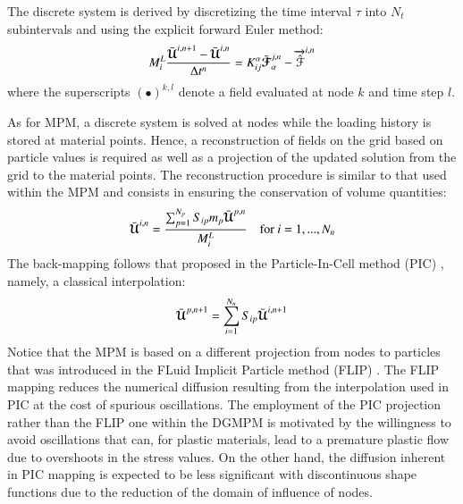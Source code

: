 The discrete system is derived by discretizing the time interval $\tau$ into $N_t$ subintervals and using the explicit forward Euler method:
\begin{equation}
  \label{eq:DGMPM_discrete}
  M^L_i \frac{\bar{{\boldsymbol{\mathcal{U}}}}^{i,n+1} - \bar{{\boldsymbol{\mathcal{U}}}}^{i,n}}{\Delta t^{n} } = K^\alpha_{ij} \bar{{\boldsymbol{\mathcal{F}}}}_{\alpha}^{j,n} - {\overrightarrow{\hat{\mathcal{F}}}}^{i,n}  
\end{equation}
where the superscripts $(\bullet)^{k,l}$ denote a field evaluated at node $k$ and time step $l$.

As for MPM, a discrete system is solved at nodes while the loading history is stored at material points.
Hence, a reconstruction of fields on the grid based on particle values is required as well as a projection of the updated solution from the grid to the material points.
The reconstruction procedure is similar to that used within the MPM and consists in ensuring the conservation of volume quantities:
\begin{equation}
  \label{eq:reconstruction}
  \bar{{\boldsymbol{\mathcal{U}}}}^{i,n} =  \frac{\sum_{p=1}^{N_p}S_{ip}m_p\bar{{\boldsymbol{\mathcal{U}}}}^{p,n}}{M_{i}^L }  \quad \text{for } i=1,...,N_n
\end{equation}
The back-mapping follows that proposed in the Particle-In-Cell method (PIC) \cite{PIC}, namely, a classical interpolation:
\begin{equation}
  \label{eq:back_mapping}
  \bar{{\boldsymbol{\mathcal{U}}}}^{p,n+1}=\sum_{i=1}^{N_n} S_{ip}\bar{{\boldsymbol{\mathcal{U}}}}^{i,n+1}
\end{equation}
Notice that the MPM is based on a different projection from nodes to particles that was introduced in the FLuid Implicit Particle method (FLIP) \cite{Mass_Flip}.
The FLIP mapping reduces the numerical diffusion resulting from the interpolation used in PIC at the cost of spurious oscillations.
The employment of the PIC projection rather than the FLIP one within the DGMPM is motivated by the willingness to avoid oscillations that can, for plastic materials, lead to a premature plastic flow due to overshoots in the stress values.
On the other hand, the diffusion inherent in PIC mapping is expected to be less significant with discontinuous shape functions due to the reduction of the domain of influence of nodes.




